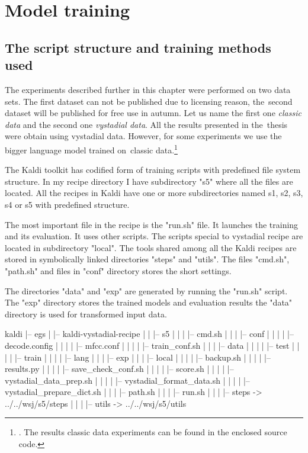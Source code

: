 \chapter{Model training}
\label{cha:training}


\section{The script structure and training methods used} 
\label{sec:the_experiments_setup}

The experiments described further in this chapter were performed on two data sets.
The first dataset can not be published due to licensing reason, 
the~second dataset will be published for free use in autumn.
Let us name the first one {\it classic data} and the second one {\it vystadial data}.
All the results presented in the~thesis were obtain using vystadial data.
However, for some experiments we use the bigger language model trained 
on~classic data.\footnote{. The results classic data experiments 
can be found in the enclosed source code.}

\small{The Kaldi toolkit has codified form of training scripts with predefined file system structure. 
In my recipe directory I have subdirectory "s5" where all the files are located. All the recipes in Kaldi have 
 one or more subdirectories named s1, s2, s3, s4 or s5 with predefined structure.

The most important file in the recipe is the "run.sh" file. It launches the training and its evaluation.
It uses other scripts. The scripts special to vystadial recipe are located in subdirectory "local".
The tools shared among all the Kaldi recipes are stored in symbolically linked directories "steps" and "utils".
The files "cmd.sh", "path.sh" and files in "conf" directory stores the short settings.

The directories "data" and "exp" are generated by running the "run.sh" script.
The "exp" directory stores the trained models and evaluation results the "data" 
directory is used for transformed input data.}

\tiny\begin{verbbox}
kaldi
|-- egs
|   |-- kaldi-vystadial-recipe
|   |   |-- s5
|   |   |   |-- cmd.sh
|   |   |   |-- conf
|   |   |   |   |-- decode.config
|   |   |   |   |-- mfcc.conf
|   |   |   |   |-- train_conf.sh
|   |   |   |-- data
|   |   |   |   |-- test 
|   |   |   |   |-- train
|   |   |   |   |-- lang
|   |   |   |-- exp
|   |   |   |-- local
|   |   |   |   |-- backup.sh
|   |   |   |   |-- results.py
|   |   |   |   |-- save_check_conf.sh
|   |   |   |   |-- score.sh
|   |   |   |   |-- vystadial_data_prep.sh
|   |   |   |   |-- vystadial_format_data.sh
|   |   |   |   |-- vystadial_prepare_dict.sh
|   |   |   |-- path.sh
|   |   |   |-- run.sh
|   |   |   |-- steps -> ../../wsj/s5/steps
|   |   |   |-- utils -> ../../wsj/s5/utils
\end{verbbox}
\normalsize

